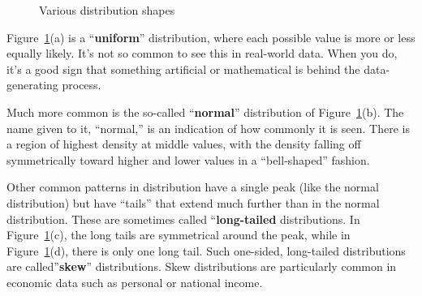 \documentclass[
  letterpaper,
  DIV=11,
  numbers=noendperiod,
  oneside]{scrartcl}
\begin{document}
\begin{figure}
\begin{minipage}{0.20\linewidth}
\end{minipage}%
%
\begin{minipage}{0.20\linewidth}



\end{minipage}%

\caption{\label{fig-violin-shapes}Various distribution shapes}

\end{figure}%

Figure~\ref{fig-violin-shapes}(a) is a ``\textbf{uniform}''
distribution, where each possible value is more or less equally likely.
It's not so common to see this in real-world data. When you do, it's a
good sign that something artificial or mathematical is behind the
data-generating process.

Much more common is the so-called ``\textbf{normal}'' distribution of
Figure~\ref{fig-violin-shapes}(b). The name given to it, ``normal,'' is
an indication of how commonly it is seen. There is a region of highest
density at middle values, with the density falling off symmetrically
toward higher and lower values in a ``bell-shaped'' fashion.

Other common patterns in distribution have a single peak (like the
normal distribution) but have ``tails'' that extend much further than in
the normal distribution. These are sometimes called
``\textbf{long-tailed} distributions. In
Figure~\ref{fig-violin-shapes}(c), the long tails are symmetrical around
the peak, while in Figure~\ref{fig-violin-shapes}(d), there is only one
long tail. Such one-sided, long-tailed distributions are
called''\textbf{skew}'' distributions. Skew distributions are
particularly common in economic data such as personal or national
income.
\end{document}
